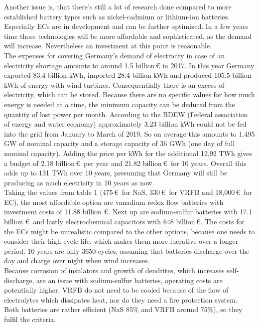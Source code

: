 \begin{parcolumns}[colwidths={1=2.5 cm, 2=10 cm, 3=2.5cm}]{3}
{Another issue is, that there's still a lot of research done compared to more established battery types such as nickel-cadmium or lithium-ion batteries. Especially ECs are in development and can be further optimized. In a few years time those technologies will be more affordable and sophisticated, as the demand will increase. Nevertheless an investment at this point is reasonable. 
\\
The expenses for covering Germany's demand of electricity in case of an electricity shortage amounts to around 1.5 billion\,\euro\,\,in 2017. In this year Germany exported 83.4 billion kWh, imported 28.4 billion kWh and produced 105.5 billion kWh of energy with wind turbines. Consequentially there is an excess of electricity, which can be stored. Because there are no specific values for how much energy is needed at a time, the minimum capacity can be deduced from the quantity of lost power per month. According to the BDEW (Federal association of energy and water economy) approximately 3.23 billion kWh could not be fed into the grid from January to March of 2019. So on average this amounts to 1.495 GW of nominal capacity and a storage capacity of 36 GWh (one day of full nominal capacity). Adding the price per kWh for the additional 12,92 TWh gives a budget of 2.18 billion\,\euro\, per year and 21.82 billion\,\euro\, for 10 years. Overall this adds up to 131 TWh over 10 years, presuming that Germany will still be producing as much electricity in 10 years as now.  \\
Taking the values from table 1 (475\,\euro\, for NaS, 330\,\euro\, for VRFB and 18,000\,\euro\, for EC), the most affordable option are vanadium redox flow batteries with investment costs of 11.88 billion \euro. Next up are sodium-sulfur batteries with 17.1 billion \euro\, and lastly electrochemical capacitors with 648 billion\,\euro. The costs for the ECs might be unrealistic compared to the other options, because one needs to consider their high cycle life, which makes them more lucrative over a longer period. 10 years are only 3650 cycles, assuming that batteries discharge over the day and charge over night when wind increases. \\
Because corrosion of insulators and growth of dendrites, which increases self-discharge, are an issue with sodium-sulfur batteries, operating costs are potentially higher. VRFB do not need to be cooled because of the flow of electrolytes which dissipates heat, nor do they need a fire protection system. \\
Both batteries are rather efficient (NaS 85$\%$ and VRFB around 75$\%$), so they fulfil the criteria.
}
\end{parcolumns}
